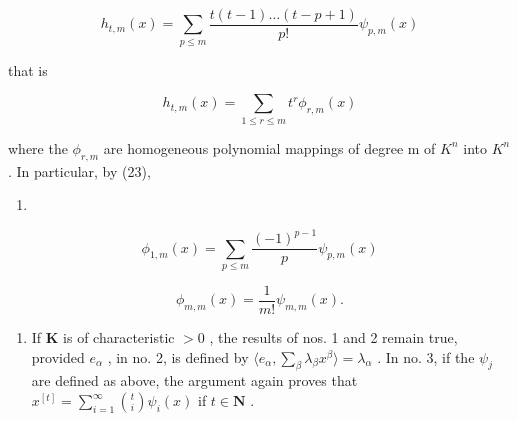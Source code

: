 \[
h _ {t, m} (x) = \sum_ {p \leqslant m} \frac {t (t - 1) \dots (t - p + 1)}{p !} \psi_ {p, m} (x)\tag{23}
\]

that is

\[
h _ {t, m} (x) = \sum_ {1 \leqslant r \leqslant m} t ^ {r} \phi_ {r, m} (x)\tag{24}
\]

where the \(\phi_{r,m}\) are homogeneous polynomial mappings of degree m of \(K^{n}\) into \(K^{n}\) . In particular, by (23),

\begin{enumerate}
\def\labelenumi{(\arabic{enumi})}
\setcounter{enumi}{24}
\tightlist
\item
\end{enumerate}

\[
\phi_ {1, m} (x) = \sum_ {p \leqslant m} \frac {(- 1) ^ {p - 1}}{p} \psi_ {p, m} (x)\tag{25}
\]

\[
\phi_ {m, m} (x) = \frac {1}{m !} \psi_ {m, m} (x).\tag{26}
\]

\begin{enumerate}
\def\labelenumi{(\arabic{enumi})}
\setcounter{enumi}{4}
\tightlist
\item
  If \(\mathbf{K}\) is of characteristic \(>0\) , the results of nos. 1 and 2 remain true, provided \(e_{\alpha}\) , in no. 2, is defined by \(\langle e_{\alpha}, \sum_{\beta} \lambda_{\beta} x^{\beta} \rangle = \lambda_{\alpha}\) . In no. 3, if the \(\psi_j\) are defined as above, the argument again proves that \(x^{[t]} = \sum_{i=1}^{\infty} \binom{t}{i} \psi_i(x)\) if \(t \in \mathbf{N}\) .
\end{enumerate}

